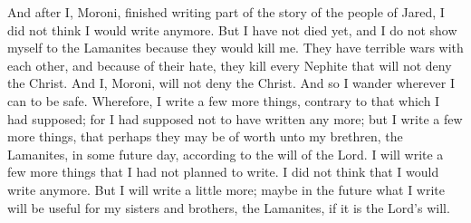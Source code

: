 \twocolumn[{%
}] \renewcommand{}


\bchapter
\bverse \iffalse Now I, Moroni, after having made an end of abridging the account of the people of Jared, I had supposed not to have written more, but I have not as yet perished; and I make not myself known to the Lamanites lest they should destroy me. \fi
And after I, Moroni, finished writing part of the story of the people of Jared, I did not think I would write anymore. But I have not died yet, and I do not show myself to the Lamanites because they would kill me.
\bverse \iffalse For behold, their wars are exceedingly fierce among themselves; and because of their hatred they put to death every Nephite that will not deny the Christ. \fi
They have terrible wars with each other, and because of their hate, they kill every Nephite that will not deny the Christ.
\bverse \iffalse And I, Moroni, will not deny the Christ; wherefore, I wander whithersoever I can for the safety of mine own life. \fi
And I, Moroni, will not deny the Christ. And so I wander wherever I can to be safe.
\bverse \iffalse Wherefore, I write a few more things, contrary to that which I had supposed; for I had supposed not to have written any more; but I write a few more things, that perhaps they may be of worth unto my brethren, the Lamanites, in some future day, according to the will of the Lord. \fi
Wherefore, I write a few more things, contrary to that which I had supposed; for I had supposed not to have written any more; but I write a few more things, that perhaps they may be of worth unto my brethren, the Lamanites, in some future day, according to the will of the Lord.
I will write a few more things that I had not planned to write. I did not think that I would write anymore. But I will write a little more; maybe in the future what I write will be useful for my sisters and brothers, the Lamanites, if it is the Lord's will.

